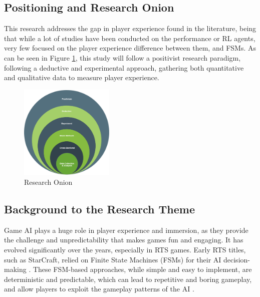 \documentclass[conference]{IEEEtran}
\begin{document}
\subsection{Positioning and Research Onion}
This research addresses the gap in player experience found in the literature, being that while a lot of studies have been conducted on the performance or RL agents,
very few focused on the player experience difference between them, and FSMs. 
As can be seen in Figure \ref{fig:research_onion}, this study will follow a positivist research paradigm,
following a deductive and experimental approach, gathering both quantitative and qualitative data to measure player experience.

\begin{figure}[htbp]
	\centering
	\includegraphics[width=0.4\textwidth]{Images/Research_Onion.PNG}
	\caption{Research Onion}
	\label{fig:research_onion}
\end{figure}


\subsection{Background to the Research Theme}

Game AI plays a huge role in player experience and immersion, as they provide the challenge and unpredictability that makes games fun and engaging.
It has evolved significantly over the years, especially in RTS games. Early RTS titles, such as StarCraft, relied on Finite State Machines (FSMs) for their AI decision-making \cite{vinyals_grandmaster_2019}. 
These FSM-based approaches, while simple and easy to implement, are deterministic and predictable, which can lead to repetitive and boring gameplay,
and allow players to exploit the gameplay patterns of the AI \cite{noauthor_finite_2020} \cite{jagdale_finite_2021}.
\end{document}
